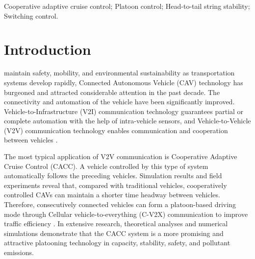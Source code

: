 \documentclass[journal]{IEEEtran}
\begin{document}
\begin{IEEEkeywords}
  Cooperative adaptive cruise control; Platoon control; Head-to-tail string stability; Switching control.
\end{IEEEkeywords}






%
\IEEEpeerreviewmaketitle



\section{Introduction}
\label{Section 1}
% 
% 
% 
% 
 maintain safety, mobility, and environmental sustainability as transportation systems develop rapidly, Connected Autonomous Vehicle (CAV) technology has burgeoned and attracted considerable attention in the past decade. The connectivity and automation of the vehicle have been significantly improved. Vehicle-to-Infrastructure (V2I) communication technology guarantees partial or complete automation with the help of intra-vehicle sensors, and Vehicle-to-Vehicle (V2V) communication technology enables communication and cooperation between vehicles \citep{wang2019survey,ploeg2011design,zhou2021impact}.

The most typical application of V2V communication is Cooperative Adaptive Cruise Control (CACC). A vehicle controlled by this type of system automatically follows the preceding vehicles. Simulation results and field experiments reveal that, compared with traditional vehicles, cooperatively controlled CAVs can maintain a shorter time headway between vehicles. Therefore, consecutively connected vehicles can form a platoon-based driving mode through Cellular vehicle-to-everything (C-V2X) communication to improve traffic efficiency \citep{VerizonNorth2020,gong2018cooperative,wang2020cooperative}. In extensive research, theoretical analyses and numerical simulations demonstrate that the CACC system is a more promising and attractive platooning technology in capacity, stability, safety, and pollutant emissions.
\end{document}
